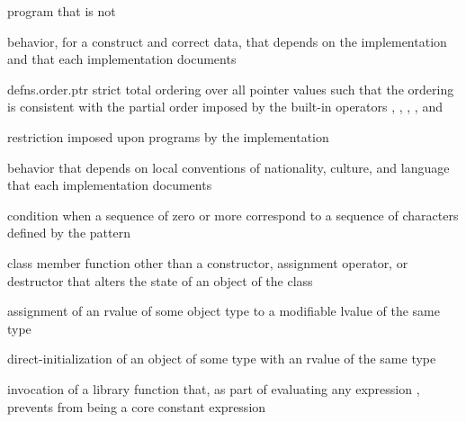 %
program that is not 

%
behavior, for a  construct and correct data, that
depends on the implementation and that each implementation documents

{defns.order.ptr}
%
strict total ordering over all pointer values
such that the ordering is consistent with the partial order
imposed by the built-in operators
\tcode{<}, \tcode{>}, \tcode{<=}, \tcode{>=}, and \tcode{<=>}

%
restriction imposed upon programs by the implementation

%
behavior that depends on local conventions of nationality, culture, and
language that each implementation documents

%
%
condition when a sequence of zero or more 
correspond to a sequence of characters defined by the pattern

%
class member function other than a constructor,
assignment operator, or destructor
that alters the state of an object of the class

%
assignment of an rvalue of some object type to a modifiable lvalue of the same type

%
direct-initialization of an object of some type with an rvalue of the same type

%
invocation of a library function that,
as part of evaluating any expression ,
prevents  from being a core constant expression

